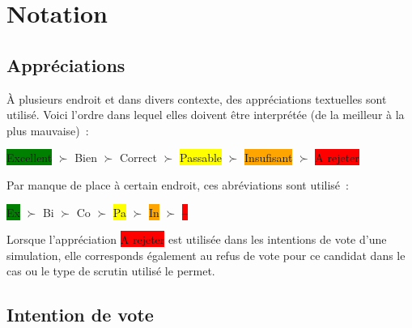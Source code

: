 \documentclass[../report]{subfiles}
\begin{document}
  \section{Notation}
  
  \subsection{Appréciations}
  
  À plusieurs endroit et dans divers contexte, des appréciations textuelles sont utilisé. 
  Voici l'ordre dans lequel elles doivent être interprétée (de la meilleur à la plus mauvaise)~:
  
  \begin{center}
  	\colorbox{green}{Excellent} $\succ$
  	\colorbox{green!50!yellow}{Bien} $\succ$
  	\colorbox{green!25!yellow}{Correct} $\succ$
  	\colorbox{yellow}{Passable} $\succ$
  	\colorbox{orange}{Insufisant} $\succ$
  	\colorbox{red}{A rejeter}
  \end{center}

  Par manque de place à certain endroit, ces abréviations sont utilisé~:

  \begin{center}
	\colorbox{green}{Ex} $\succ$
	\colorbox{green!50!yellow}{Bi} $\succ$
	\colorbox{green!25!yellow}{Co} $\succ$
	\colorbox{yellow}{Pa} $\succ$
	\colorbox{orange}{In} $\succ$
	\colorbox{red}{--}
  \end{center}

  Lorsque l'appréciation \colorbox{red}{A rejeter} est utilisée dans les intentions de vote d'une simulation, 
  elle corresponds également au refus de vote pour ce candidat dans le cas ou le type de scrutin utilisé le permet.
  
  \subsection{Intention de vote}
  
\end{document}
